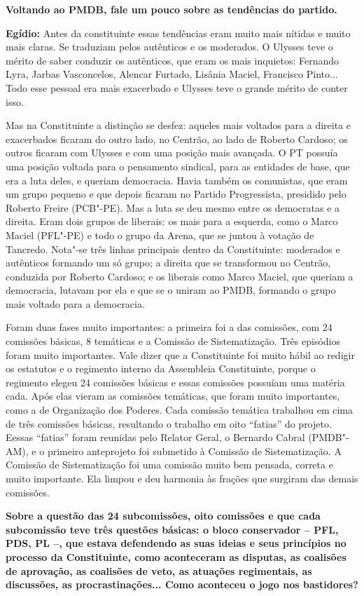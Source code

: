 \textbf{Voltando ao PMDB, fale um pouco sobre as tendências do partido.}

\textbf{Egídio:} Antes da constituinte essas tendências eram muito mais
nítidas e muito mais claras. Se traduziam pelos autênticos e os
moderados. O Ulysses teve o mérito de saber conduzir os autênticos, que
eram os mais inquietos: Fernando Lyra, Jarbas Vasconcelos, Alencar
Furtado, Lisânia Maciel, Francisco Pinto... Todo esse pessoal era mais
exacerbado e Ulysses teve o grande mérito de conter isso.

Mas na Constituinte a distinção se desfez: aqueles mais voltados para a
direita e exacerbados ficaram do outro lado, no Centrão, ao lado de
Roberto Cardoso; os outros ficaram com Ulysses e com uma posição mais
avançada. O PT possuía uma posição voltada para o pensamento sindical,
para as entidades de base, que era a luta deles, e queriam democracia.
Havia também os comunistas, que eram um grupo pequeno e que depois
ficaram no Partido Progressista, presidido pelo Roberto Freire (PCB"-PE).
Mas a luta se deu mesmo entre os democratas e a direita. Eram dois
grupos de liberais: os mais para a esquerda, como o Marco Maciel
(PFL"-PE) e todo o grupo da Arena, que se juntou à votação de Tancredo.
Nota"-se três linhas principais dentro da Constituinte: moderados e
autênticos formando um só grupo; a direita que se transformou no
Centrão, conduzida por Roberto Cardoso; e os liberais como Marco Maciel,
que queriam a democracia, lutavam por ela e que se o uniram ao PMDB,
formando o grupo mais voltado para a democracia.

Foram duas fases muito importantes: a primeira foi a das comissões, com
24 comissões básicas, 8 temáticas e a Comissão de Sistematização. Três
episódios foram muito importantes. Vale dizer que a Constituinte foi
muito hábil ao redigir os estatutos e o regimento interno da Assembleia
Constituinte, porque o regimento elegeu 24 comissões básicas e essas
comissões possuíam uma matéria cada. Após elas vieram as comissões
temáticas, que foram muito importantes, como a de Organização dos
Poderes. Cada comissão temática trabalhou em cima de três comissões
básicas, resultando o trabalho em oito ``fatias'' do projeto. Eessas
``fatias'' foram reunidas pelo Relator Geral, o Bernardo Cabral
(PMDB"-AM), e o primeiro anteprojeto foi submetido à Comissão de
Sistematização. A Comissão de Sistematização foi uma comissão muito bem
pensada, correta e muito importante. Ela limpou e deu harmonia às
frações que surgiram das demais comissões.

\textbf{Sobre a questão das 24 subcomissões, oito comissões e que cada
subcomissão teve três questões básicas: o bloco conservador -- PFL, PDS,
PL --, que estava defendendo as suas ideias e seus princípios no
processo da Constituinte, como aconteceram as disputas, as coalisões de
aprovação, as coalisões de veto, as atuações regimentais, as discussões,
as procrastinações... Como aconteceu o jogo nos bastidores?}

